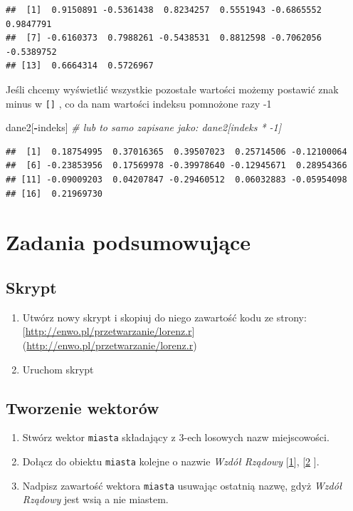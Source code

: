 \documentclass[]{book}
\newenvironment{Shaded}{\begin{snugshade}}{\end{snugshade}}
\newcommand{\CommentTok}[1]{\textcolor[rgb]{0.56,0.35,0.01}{\textit{#1}}}
\newcommand{\OperatorTok}[1]{\textcolor[rgb]{0.81,0.36,0.00}{\textbf{#1}}}
\newcommand{\NormalTok}[1]{#1}
\theoremstyle{definition}
\theoremstyle{definition}
\theoremstyle{definition}
\theoremstyle{remark}
\begin{document}
\begin{verbatim}
##  [1]  0.9150891 -0.5361438  0.8234257  0.5551943 -0.6865552  0.9847791
##  [7] -0.6160373  0.7988261 -0.5438531  0.8812598 -0.7062056 -0.5389752
## [13]  0.6664314  0.5726967
\end{verbatim}

Jeśli chcemy wyświetlić wszystkie pozostałe wartości możemy postawić
znak minus w \texttt{{[}{]}} , co da nam wartości indeksu pomnożone razy
-1

\begin{Shaded}
\begin{Highlighting}[]
\NormalTok{dane2[}\OperatorTok{-}\NormalTok{indeks] }\CommentTok{# lub to samo zapisane jako: dane2[indeks * -1]}
\end{Highlighting}
\end{Shaded}

\begin{verbatim}
##  [1]  0.18754995  0.37016365  0.39507023  0.25714506 -0.12100064
##  [6] -0.23853956  0.17569978 -0.39978640 -0.12945671  0.28954366
## [11] -0.09009203  0.04207847 -0.29460512  0.06032883 -0.05954098
## [16]  0.21969730
\end{verbatim}

\section{Zadania podsumowujące}\label{zadania-podsumowujace}

\subsection{Skrypt}\label{skrypt}

\begin{enumerate}
\def\labelenumi{\arabic{enumi}.}
\item
  Utwórz nowy skrypt i skopiuj do niego zawartość kodu ze strony:
  {[}\url{http://enwo.pl/przetwarzanie/lorenz.r}{]}
  (\url{http://enwo.pl/przetwarzanie/lorenz.r})
\item
  Uruchom skrypt
\end{enumerate}

\subsection{Tworzenie wektorów}\label{tworzenie-wektorow}

\begin{enumerate}
\def\labelenumi{\arabic{enumi}.}
\item
  Stwórz wektor \texttt{miasta} składający z 3-ech losowych nazw
  miejscowości.
\item
  Dołącz do obiektu \texttt{miasta} kolejne o nazwie \emph{Wzdół
  Rządowy}
  {[}\href{https://pl.wikipedia.org/wiki/Wzd\%C3\%B3\%C5\%82_Rz\%C4\%85dowy}{1}{]},
  {[}\href{http://www.tvp.info/2514948/po-godzinach/bialy-kal-zniknal-suchecipki-zostaja/}{2}
  {]}.
\item
  Nadpisz zawartość wektora \texttt{miasta} usuwając ostatnią nazwę,
  gdyż \emph{Wzdół Rządowy} jest wsią a nie miastem.
\end{enumerate}
\end{document}
